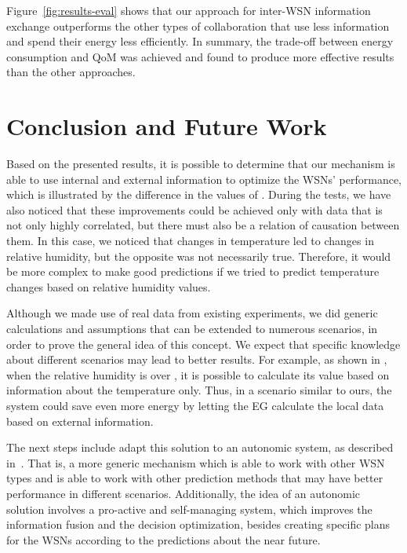 \documentclass{llncs}
\begin{document}
Figure~\ref{fig:results-eval} shows that our approach for inter-WSN information 
exchange outperforms the other types of collaboration that use less information 
and spend their energy less efficiently. In summary, the trade-off between 
energy consumption and QoM was achieved and found to produce more effective 
results than the other approaches.









\section{Conclusion and Future Work}
\label{sec:conclusion}

Based on the presented results, it is possible to determine that our mechanism 
is able to use internal and external information to optimize the WSNs' 
performance, which is illustrated by the difference in the values of . During 
the tests, we have also noticed that these improvements could be achieved only 
with data that is not only highly correlated, but there must also be a relation 
of causation between them. 
In this case, we noticed that changes in temperature led to changes in relative 
humidity, but the opposite was not necessarily true. Therefore, it would be 
more complex to make good predictions if we tried to predict 
temperature changes based on relative humidity values.

Although we made use of real data from existing experiments, we did generic 
calculations and assumptions that can be extended to numerous scenarios, in 
order to prove the general idea of this concept. We expect that specific 
knowledge about different scenarios may lead to better results. For example, as 
shown in \cite{Lawrence2005}, when the relative humidity is over , it is 
possible to calculate its value based on information about the temperature 
only. Thus, in a scenario similar to ours, the system could save 
even more energy by letting the EG calculate the local data based on 
external information.




The next steps include adapt this solution to an autonomic system, as described 
in~\cite{6583430}. That is, a more generic mechanism which is able to work with 
other WSN types and is able to work with other prediction methods that may have 
better performance in different scenarios.
Additionally, the idea of an autonomic solution involves a pro-active and 
self-managing system, which improves the information fusion and the decision 
optimization, besides creating specific plans for the WSNs according to the 
predictions about the near future.
\end{document}
